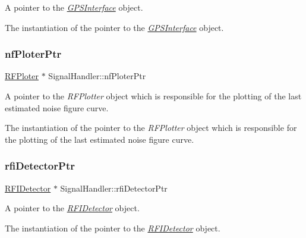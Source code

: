 A pointer to the {\itshape \hyperlink{classGPSInterface}{G\+P\+S\+Interface}} object. 

The instantiation of the pointer to the {\itshape \hyperlink{classGPSInterface}{G\+P\+S\+Interface}} object. \mbox{\label{classSignalHandler_ada606b8ef692809838f1e5464871742c}} 
\subsubsection{\texorpdfstring{nf\+Ploter\+Ptr}{nfPloterPtr}}
{\footnotesize\ttfamily \hyperlink{classRFPloter}{R\+F\+Ploter} $\ast$ Signal\+Handler\+::nf\+Ploter\+Ptr\hspace{0.3cm}{\ttfamily [static]}}



A pointer to the {\itshape R\+F\+Plotter} object which is responsible for the plotting of the last estimated noise figure curve. 

The instantiation of the pointer to the {\itshape R\+F\+Plotter} object which is responsible for the plotting of the last estimated noise figure curve. \mbox{\label{classSignalHandler_a9ce3533694e1e412496dc5a9b339ccc3}} 
\subsubsection{\texorpdfstring{rfi\+Detector\+Ptr}{rfiDetectorPtr}}
{\footnotesize\ttfamily \hyperlink{classRFIDetector}{R\+F\+I\+Detector} $\ast$ Signal\+Handler\+::rfi\+Detector\+Ptr\hspace{0.3cm}{\ttfamily [static]}}



A pointer to the {\itshape \hyperlink{classRFIDetector}{R\+F\+I\+Detector}} object. 

The instantiation of the pointer to the {\itshape \hyperlink{classRFIDetector}{R\+F\+I\+Detector}} object. \mbox{\label{classSignalHandler_a0b9c75b3e3c928c01cc5e44d42e5ac38}} 
